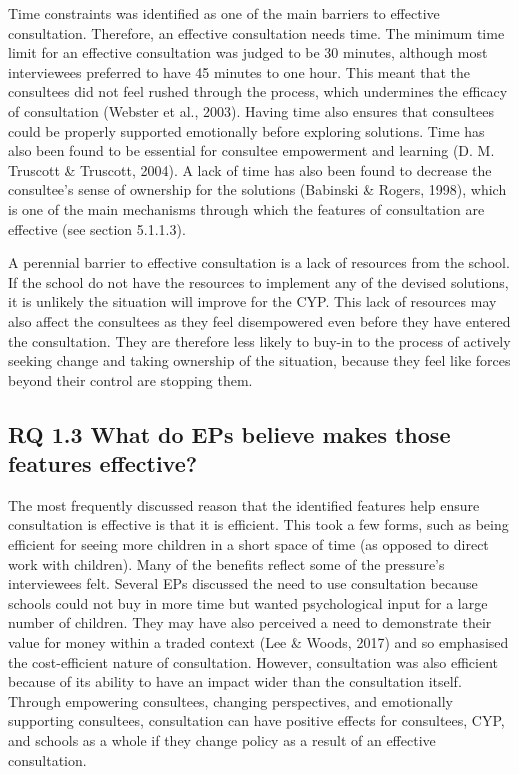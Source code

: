 \documentclass[
  english,
  man,floatsintext]{apa6}
\begin{document}
Time constraints was identified as one of the main barriers to effective
consultation. Therefore, an effective consultation needs time. The
minimum time limit for an effective consultation was judged to be 30
minutes, although most interviewees preferred to have 45 minutes to one
hour. This meant that the consultees did not feel rushed through the
process, which undermines the efficacy of consultation
(Webster et al., 2003). Having time also ensures
that consultees could be properly supported emotionally before exploring
solutions. Time has also been found to be essential for consultee
empowerment and learning (D. M. Truscott \& Truscott, 2004). A
lack of time has also been found to decrease the consultee's sense of
ownership for the solutions (Babinski \& Rogers, 1998), which
is one of the main mechanisms through which the features of consultation
are effective (see section 5.1.1.3).

A perennial barrier to effective consultation is a lack of resources
from the school. If the school do not have the resources to implement
any of the devised solutions, it is unlikely the situation will improve
for the CYP. This lack of resources may also affect the consultees as
they feel disempowered even before they have entered the consultation.
They are therefore less likely to buy-in to the process of actively
seeking change and taking ownership of the situation, because they feel
like forces beyond their control are stopping them.

\hypertarget{rq-1.3-what-do-eps-believe-makes-those-features-effective}{%
\subsection{RQ 1.3 What do EPs believe makes those features effective?}\label{rq-1.3-what-do-eps-believe-makes-those-features-effective}}

The most frequently discussed reason that the identified features help
ensure consultation is effective is that it is efficient. This took a
few forms, such as being efficient for seeing more children in a short
space of time (as opposed to direct work with children). Many of the
benefits reflect some of the pressure's interviewees felt. Several EPs
discussed the need to use consultation because schools could not buy in
more time but wanted psychological input for a large number of children.
They may have also perceived a need to demonstrate their value for money
within a traded context (Lee \& Woods, 2017) and so
emphasised the cost-efficient nature of consultation. However,
consultation was also efficient because of its ability to have an impact
wider than the consultation itself. Through empowering consultees,
changing perspectives, and emotionally supporting consultees,
consultation can have positive effects for consultees, CYP, and schools
as a whole if they change policy as a result of an effective
consultation.
\end{document}
